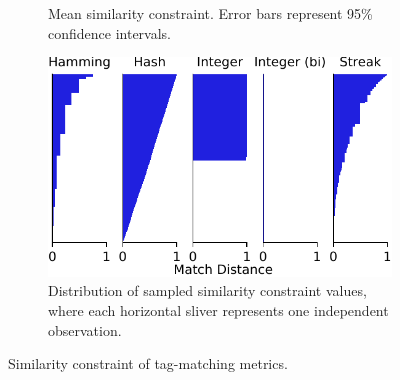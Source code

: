 \begin{figure}
\begin{center}
\begin{subfigure}[b]{\linewidth}
\begin{minipage}{0.6\linewidth}
\end{minipage}
\begin{minipage}{0.35\linewidth}
\caption{
Mean similarity constraint.
Error bars represent 95\% confidence intervals.
}
\label{fig:sphere_barplot}
\end{minipage}
\end{subfigure}
\begin{minipage}{\linewidth}
\begin{subfigure}[b]{\linewidth}
\centering
\includegraphics[width=\linewidth]{img/sphere/bitweight=0dot5+seed=1+title=dimensionality_distnplot+_data_hathash_hash=c0f6c5cf854ff253+_script_fullcat_hash=03ce1e318a24a109+ext=}
\begin{minipage}{0.8\textwidth}
\caption{
Distribution of sampled similarity constraint values, where each horizontal sliver represents one independent observation.
}
\label{fig:sphere_distnplot}
\end{minipage}
\end{subfigure}
\end{minipage}

\caption{
Similarity constraint of tag-matching metrics.
}
\label{fig:sphere}

\end{center}
\end{figure}
